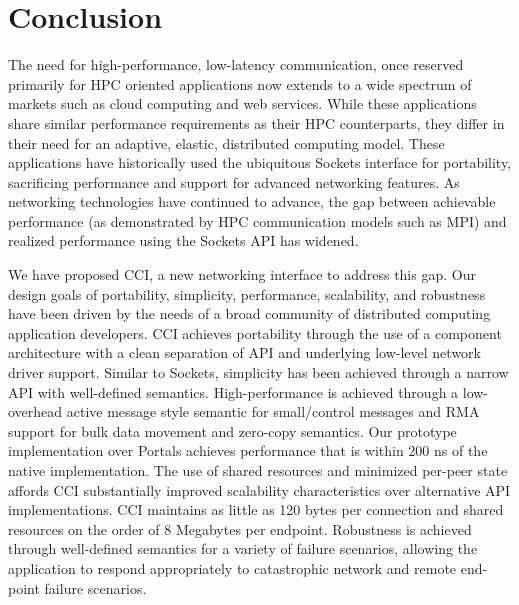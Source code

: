 \section{Conclusion}
\label{sec:conclusion}

The need for high-performance, low-latency communication, once
reserved primarily for HPC oriented applications now extends to a wide
spectrum of markets such as cloud computing and web services. 
While these applications share similar
performance requirements as their HPC counterparts, they differ in
their need for an adaptive, elastic, distributed computing
model. These applications have historically used the ubiquitous
Sockets interface for portability, sacrificing performance and support for advanced
networking features. As networking technologies have
continued to advance, the gap between achievable performance (as
demonstrated by HPC communication models such as MPI) and realized
performance using the Sockets API has widened. 

We have proposed CCI, a new networking interface to address this gap. 
Our design goals of portability, simplicity, performance, scalability,
and robustness have been driven by the needs of a broad community of
distributed computing application developers. CCI achieves portability
through the use of a component architecture with a clean separation of
API and underlying low-level network driver support. Similar to
Sockets, simplicity has been achieved through a narrow API with
well-defined semantics. High-performance is achieved through a
low-overhead active message style semantic for small/control messages
and RMA support for bulk data movement and zero-copy
semantics. Our prototype implementation over Portals achieves performance that is
within 200 ns of the native implementation. The use of shared
resources and minimized per-peer state affords CCI substantially
improved scalability characteristics over alternative API
implementations. CCI maintains as little as 120 bytes per connection
and shared resources on the order of 8 Megabytes per endpoint. Robustness is
achieved through well-defined semantics for a variety of failure
scenarios, allowing the application to respond appropriately to
catastrophic network and remote end-point failure scenarios.  



